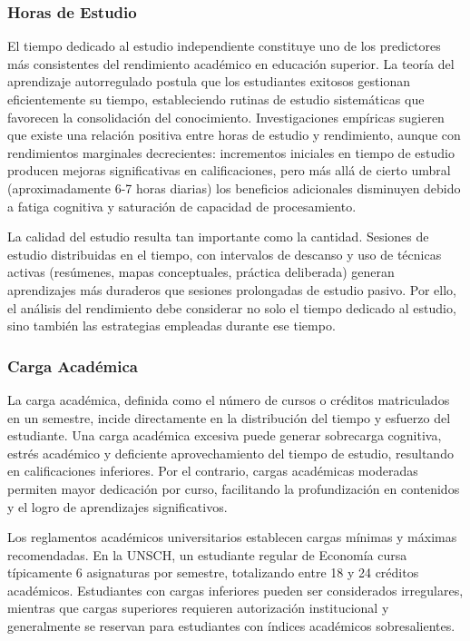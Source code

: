 \documentclass[
  stu,
  floatsintext,
  longtable,
  a4paper,
  nolmodern,
  notxfonts,
  notimes,
  12pt,
  colorlinks=true,linkcolor=blue,citecolor=blue,urlcolor=blue]{apa7}
\begin{document}
\subsubsection{Horas de Estudio}\label{horas-de-estudio}

El tiempo dedicado al estudio independiente constituye uno de los
predictores más consistentes del rendimiento académico en educación
superior. La teoría del aprendizaje autorregulado postula que los
estudiantes exitosos gestionan eficientemente su tiempo, estableciendo
rutinas de estudio sistemáticas que favorecen la consolidación del
conocimiento. Investigaciones empíricas sugieren que existe una relación
positiva entre horas de estudio y rendimiento, aunque con rendimientos
marginales decrecientes: incrementos iniciales en tiempo de estudio
producen mejoras significativas en calificaciones, pero más allá de
cierto umbral (aproximadamente 6-7 horas diarias) los beneficios
adicionales disminuyen debido a fatiga cognitiva y saturación de
capacidad de procesamiento.

La calidad del estudio resulta tan importante como la cantidad. Sesiones
de estudio distribuidas en el tiempo, con intervalos de descanso y uso
de técnicas activas (resúmenes, mapas conceptuales, práctica deliberada)
generan aprendizajes más duraderos que sesiones prolongadas de estudio
pasivo. Por ello, el análisis del rendimiento debe considerar no solo el
tiempo dedicado al estudio, sino también las estrategias empleadas
durante ese tiempo.

\subsubsection{Carga Académica}\label{carga-acaduxe9mica}

La carga académica, definida como el número de cursos o créditos
matriculados en un semestre, incide directamente en la distribución del
tiempo y esfuerzo del estudiante. Una carga académica excesiva puede
generar sobrecarga cognitiva, estrés académico y deficiente
aprovechamiento del tiempo de estudio, resultando en calificaciones
inferiores. Por el contrario, cargas académicas moderadas permiten mayor
dedicación por curso, facilitando la profundización en contenidos y el
logro de aprendizajes significativos.

Los reglamentos académicos universitarios establecen cargas mínimas y
máximas recomendadas. En la UNSCH, un estudiante regular de Economía
cursa típicamente 6 asignaturas por semestre, totalizando entre 18 y 24
créditos académicos. Estudiantes con cargas inferiores pueden ser
considerados irregulares, mientras que cargas superiores requieren
autorización institucional y generalmente se reservan para estudiantes
con índices académicos sobresalientes.
\end{document}
